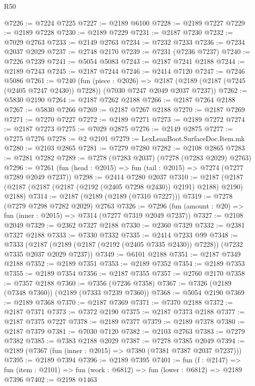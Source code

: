 \begin{lexlean}{R50}
\begin{coremodule}
@7226 := @7224 @7225
@7227 := @2189 @6100
@7228 := @2189 @7227
@7229 := @2189 @7228
@7230 := @2189 @7229
@7231 := @2187 @7230
@7232 := @7029 @2763
@7233 := @2149 @2763
@7234 := @7232 @7233
@7236 := @7234 @2037 @2029
@7237 := @2748 @2170
@7239 := @7231 (@7236 @7237)
@7240 := @7226 @7239
@7241 := @5054 @5083
@7243 := @2187 @7241 @2188
@7244 := @2189 @7243
@7245 := @2187 @7244
@7246 := @2414 @7120
@7247 := @7246 @5086
@7261 := @7240
    (fun (piece : @2026) =>
    @2187 (@2189 (@2187 (@7245 (@2405 @7247 @2430)) @7228)) (@7030 @7247 @2049 @2037 @7237))
@7262 := @5830 @2190
@7264 := @2187 @7262 @2188
@7266 := @2187 @7264 @2188
@7267 := @5830 @7266
@7269 := @2187 @7267 @2188
@7270 := @2187 @7269
@7271 := @7270 @7227
@7272 := @2189 @7271
@7273 := @2189 @7272
@7274 := @2187 @7273
@7275 := @7029 @2875
@7276 := @2149 @2875
@7277 := @7275 @7276
@7278 := @2 @2101
@7279 := LexLeanBoot.SurfaceDoc.Item.mk
@7280 := @2103 @2865
@7281 := @7279 @7280
@7282 := @2108 @2865
@7283 := @7281 @7282
@7289 := @7278 (@7283 @2037) (@7278 (@7283 @2029) @2763)
@7296 := @7261 (fun (head : @2015) => fun (tail : @2015) => @7274 (@7277 @7289 @2049 @7237))
@7298 := @2414 @7280 @2037
@7310 := @2187 (@2187 (@2187 (@2187 (@2187 (@2192 (@2405 @7298 @2430)) @2191) @2188) @2190) @2188)
@7314 := @2187 (@2189 (@2189 (@7310 @7227)))
@7319 := @7278 (@7279 @7298 @7282 @2029) @2763
@7326 := @7296 (fun (amount : @20) => fun (inner : @2015) => @7314 (@7277 @7319 @2049 @7237))
@7327 := @2108 @2049
@7329 := @2362 @7327 @2188
@7330 := @2360 @7329
@7332 := @2381 @7327 @2188
@7333 := @7330 @7332
@7335 := @2414 @7233 @99
@7348 := @7333
    (@2187 (@2189 (@2187 (@2192 (@2405 @7335 @2430)) @7228)) (@7232 @7335 @2037 @2029 @7237))
@7349 := @6101 @2188
@7351 := @2187 @7349 @2188
@7352 := @2189 @7351
@7353 := @2189 @7352
@7354 := @2189 @7353
@7355 := @2189 @7354
@7356 := @2187 @7355
@7357 := @2760 @2170
@7358 := @7357 @2188
@7360 := @7356 (@7236 @7358)
@7367 := @7326 (@2189 (@7348 @7360)) (@2189 (@7333 @7239 @7360))
@7368 := @5054 @2190
@7369 := @2189 @7368
@7370 := @2187 @7369
@7371 := @7370 @2188
@7372 := @2187 @7371
@7373 := @7372 @2190
@7375 := @2187 @7373 @2188
@7377 := @2187 @7375 @7227
@7378 := @2189 @7377
@7379 := @2189 @7378
@7380 := @2187 @7379
@7381 := @7030 @7120
@7382 := @2103 @2763
@7383 := @7279 @7382
@7385 := @7383 @2188 @2029
@7387 := @7278 @7385 @2049
@7394 := @2189 (@7367 (fun (inner : @2015) => @7380 (@7381 @7387 @2037 @7237)))
@7395 := @2189 @7394
@7396 := @2189 @7395
@7401 := fun (f : @2147) =>
  fun (item : @2101) => fun (work : @6812) => fun (lower : @6812) => @2189 @7396
@7402 := @2198 @1463

\end{coremodule}
\end{lexlean}
